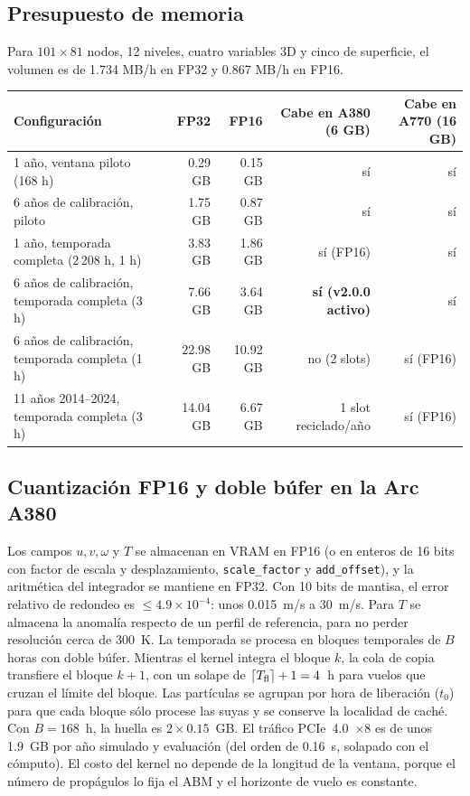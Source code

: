 \documentclass[11pt,letterpaper]{article}
\begin{document}
\subsection{Presupuesto de memoria}
Para $101\times81$ nodos, 12 niveles, cuatro variables 3D y cinco de superficie, el volumen es de 1.734 MB/h en FP32 y 0.867 MB/h en FP16.
\begin{center}\small
\begin{tabularx}{\textwidth}{@{}Yrrrr@{}}\toprule
Configuración & FP32 & FP16 & Cabe en A380 (6 GB) & Cabe en A770 (16 GB)\\ año, ventana piloto (168 h) & 0.29 GB & 0.15 GB & sí & sí\\
6 años de calibración, piloto & 1.75 GB & 0.87 GB & sí & sí\\
1 año, temporada completa (2\,208 h, 1 h) & 3.83 GB & 1.86 GB & sí (FP16) & sí\\
6 años de calibración, temporada completa (3 h) & 7.66 GB & 3.64 GB & \textbf{sí (v2.0.0 activo)} & sí\\
6 años de calibración, temporada completa (1 h) & 22.98 GB & 10.92 GB & no (2 slots) & sí (FP16)\\
11 años 2014--2024, temporada completa (3 h) & 14.04 GB & 6.67 GB & 1 slot reciclado/año & sí (FP16)\\
\bottomrule\end{tabularx}\end{center}

\subsection{Cuantización FP16 y doble búfer en la Arc A380}
Los campos $u,v,\omega$ y $T$ se almacenan en VRAM en FP16 (o en enteros de 16 bits con factor de escala y desplazamiento, \texttt{scale\_factor} y \texttt{add\_offset}), y la aritmética del integrador se mantiene en FP32. Con 10 bits de mantisa, el error relativo de redondeo es $\le4.9\times10^{-4}$: unos 0.015~m/s a 30~m/s. Para $T$ se almacena la anomalía respecto de un perfil de referencia, para no perder resolución cerca de 300~K. La temporada se procesa en bloques temporales de $B$ horas con doble búfer. Mientras el kernel integra el bloque $k$, la cola de copia transfiere el bloque $k+1$, con un solape de $\lceil T_{\rm fl}\rceil+1=4$~h para vuelos que cruzan el límite del bloque. Las partículas se agrupan por hora de liberación ($t_0$) para que cada bloque sólo procese las suyas y se conserve la localidad de caché. Con $B=168$~h, la huella es $2\times0.15$~GB. El tráfico PCIe~4.0~$\times8$ es de unos 1.9~GB por año simulado y evaluación (del orden de 0.16~s, solapado con el cómputo). El costo del kernel no depende de la longitud de la ventana, porque el número de propágulos lo fija el ABM y el horizonte de vuelo es constante.
\end{document}
